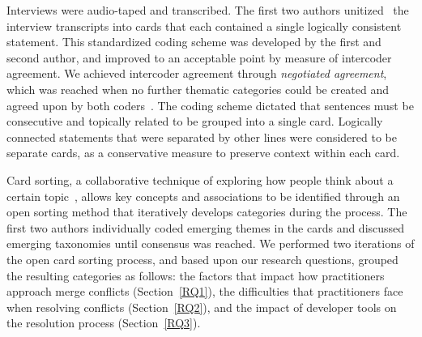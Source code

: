  Interviews were audio-taped and transcribed. 
The first two authors unitized~\cite{unitization} the interview transcripts into cards that each contained a single logically consistent statement. 
This standardized coding scheme was developed by the first and second author, and improved to an acceptable point by measure of intercoder agreement.
We achieved intercoder agreement through \textit{negotiated agreement}, which was reached when no further thematic categories could be created and agreed upon by both coders~\cite{garrison2006revisiting}\cite{ritchie2013qualitative}.
The coding scheme dictated that sentences must be consecutive and topically related to be grouped into a single card. Logically connected statements that were separated by other lines were considered to be separate cards, as a conservative measure to preserve context within each card.

Card sorting, a collaborative technique of exploring how people think about a certain topic~\cite{spencer2009card}\cite{card_sort}, allows key concepts and associations to be identified through an open sorting method that iteratively develops categories during the process.
The first two authors individually coded emerging themes in the cards and discussed emerging taxonomies until consensus was reached.
We performed two iterations of the open card sorting process, and based upon our research questions, grouped the resulting categories as follows: the factors that impact how practitioners approach merge conflicts (Section~\ref{RQ1}), the difficulties that practitioners face when resolving conflicts (Section~\ref{RQ2}), and the impact of developer tools on the resolution process (Section~\ref{RQ3}).


